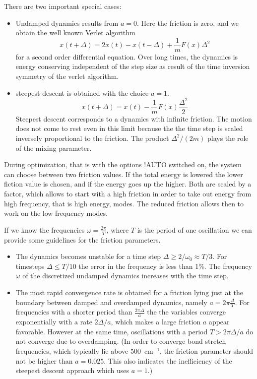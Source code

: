 \documentclass[final,12pt,makeidx,DIV=calc]{article}
\begin{document}
{{{{{{There are two important special cases:
\begin{itemize}
\item Undamped dynamics results from $a=0$. Here the friction is zero,
and we obtain the well known Verlet algorithm
\begin{displaymath}
x(t+\Delta)=2x(t)-x(t-\Delta)+\frac{1}{m}F(x)\Delta^2
\end{displaymath}
  for a second order differential equation. Over long times, the
  dynamics is energy conserving independent of the step size as result
  of the time inversion symmetry of the verlet algorithm.
\item steepest descent is obtained with the choice $a=1$.
   \begin{displaymath}
    x(t+\Delta)=x(t)-\frac{1}{m}F(x)\frac{\Delta^2}{2}
    \end{displaymath}
      Steepest descent corresponds to a dynamics with infinite
      friction.  The motion does not come to rest even in this limit
      because the the time step is scaled inversely proportional to
      the friction. The product $\Delta^2/(2m)$ plays the role of the
      mixing parameter.
\end{itemize}


During optimization, that is with the options !AUTO switched on, the
system can choose between two friction values. If the total energy is
lowered the lower fiction value is chosen, and if the energy goes up
the higher. Both are scaled by a factor, which allows to start with a
high friction in order to take out energy from high frequency, that is
high energy, modes. The reduced friction allows then to work on the
low frequency modes.


If we know the frequencies $\omega=\frac{2\pi}{T}$, where $T$ is the
period of one oscillation we can provide some guidelines for the
friction parameters.
\begin{itemize}
\item The dynamics becomes unstable for a time step $\Delta\ge
    2/\omega_0\approx T/3$. For timesteps $\Delta\le T/10$ the error
    in the frequency is less than 1\%.  The frequency $\omega$ of the
    discretized undamped dynamics increases with the time step.
\item The most rapid convergence rate is obtained for a friction
    lying just at the boundary between damped and overdamped dynamics,
    namely $a=2\pi\frac{\Delta}{T}$. For frequencies with a shorter
    period than $\frac{2\pi\Delta}{a}$ the the variables converge
    exponentially with a rate $2\Delta/a$, which makes a large
    friction $a$ appear favorable.  However at the same time,
    oscillations with a period $T>2\pi\Delta/a$ do not converge due to
    overdamping. (In order to converge bond stretch frequencies, which
    typically lie above 500~cm$^{-1}$, the friction parameter should
    not be higher than $a=0.025$. This also indicates the inefficiency
    of the steepest descent approach which uses $a=1$.)
\end{itemize}

}}}}}}
\end{document}
